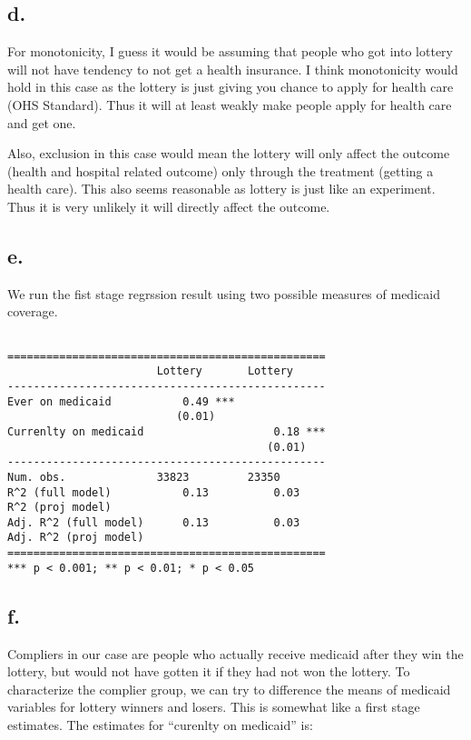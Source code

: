 \documentclass[
  letterpaper,
  DIV=11,
  numbers=noendperiod]{scrartcl}
\begin{document}
\subsection{d.}\label{d.-1}

For monotonicity, I guess it would be assuming that people who got into
lottery will not have tendency to not get a health insurance. I think
monotonicity would hold in this case as the lottery is just giving you
chance to apply for health care (OHS Standard). Thus it will at least
weakly make people apply for health care and get one.

Also, exclusion in this case would mean the lottery will only affect the
outcome (health and hospital related outcome) only through the treatment
(getting a health care). This also seems reasonable as lottery is just
like an experiment. Thus it is very unlikely it will directly affect the
outcome.

\subsection{e.}\label{e.-1}

We run the fist stage regrssion result using two possible measures of
medicaid coverage.

\begin{verbatim}

=================================================
                       Lottery       Lottery     
-------------------------------------------------
Ever on medicaid           0.49 ***              
                          (0.01)                 
Currenlty on medicaid                    0.18 ***
                                        (0.01)   
-------------------------------------------------
Num. obs.              33823         23350       
R^2 (full model)           0.13          0.03    
R^2 (proj model)                                 
Adj. R^2 (full model)      0.13          0.03    
Adj. R^2 (proj model)                            
=================================================
*** p < 0.001; ** p < 0.01; * p < 0.05
\end{verbatim}

\subsection{f.}\label{f.}

Compliers in our case are people who actually receive medicaid after
they win the lottery, but would not have gotten it if they had not won
the lottery. To characterize the complier group, we can try to
difference the means of medicaid variables for lottery winners and
losers. This is somewhat like a first stage estimates. The estimates for
``curenlty on medicaid'' is:
\end{document}
